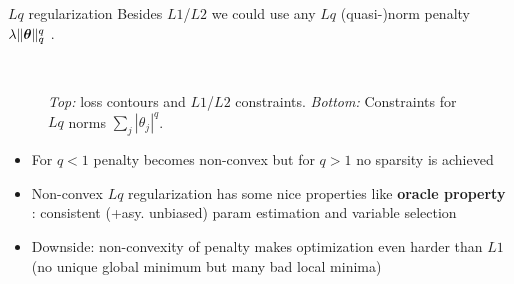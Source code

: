 \documentclass[11pt,compress,t,notes=noshow, xcolor=table]{beamer}
\begin{document}
\begin{vbframe}{$Lq$ regularization}
Besides $L1$/$L2$ we could use any $Lq$ (quasi-)norm penalty $\lambda \Vert \bm{\theta} \Vert_q^q$ .


\begin{figure}
  \\
\caption{{\scriptsize \textit{Top:} loss contours and $L1$/$L2$ constraints.
\textit{Bottom:} Constraints for $Lq$ norms $\sum_j |\theta_j|^q$.}}
\end{figure}
\vspace{-0.4cm}
{\footnotesize
\begin{itemize}
    \item For $q<1$ penalty becomes non-convex but for $q>1$ no sparsity is achieved
    \item Non-convex $Lq$ regularization has some nice properties like \textbf{oracle property} : consistent (+asy. unbiased) param estimation and variable selection
    \item Downside: non-convexity of penalty makes optimization even harder than $L1$ (no unique global minimum but many bad local minima)
\end{itemize}
}
\end{vbframe}
\end{document}
